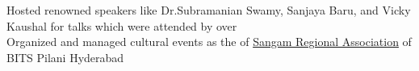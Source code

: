 \documentclass[]{barua-resume-openfont}
\begin{document}
\begin{minipage}[t]{0.67\textwidth}
\descript{}
\textbullet{} Hosted renowned speakers like Dr.Subramanian Swamy, Sanjaya Baru, and Vicky Kaushal for talks which were attended by over 
{}\\
\textbullet{} Organized and managed cultural events as the
{} of
{\href{https://www.facebook.com/Sangam-Regional-Association-BPHC-105858744561862}{Sangam Regional Association}} of BITS Pilani Hyderabad


\sectionsep
\bigskip

\end{minipage}
\end{document}
